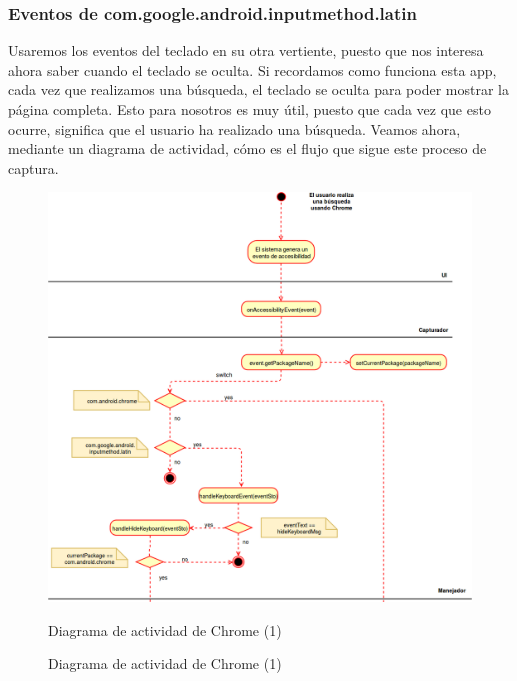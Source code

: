 \documentclass[12pt,a4paper,oneside]{book} %
\begin{document}
\subsubsection{Eventos de com.google.android.inputmethod.latin}
Usaremos los eventos del teclado en su otra vertiente, puesto que nos interesa ahora saber cuando el teclado se oculta. 
\newline \newline 
Si recordamos como funciona esta app, cada vez que realizamos una búsqueda, el teclado se oculta para poder mostrar la página completa. Esto para nosotros es muy útil, puesto que cada vez que esto ocurre, significa que el usuario ha realizado una búsqueda. 
\newline \newline
Veamos ahora, mediante un diagrama de actividad, cómo es el flujo que sigue este proceso de captura. 
\begin{landscape}
\begin{figure}[htb]
	\begin{center}
     	\includegraphics[scale=0.4]{pictures/activity/chromeActivityDiagram1.png}
	    	\caption{Diagrama de actividad de Chrome (1)}{Diagrama de actividad de Chrome (1)}
    	\label{fig:Diagrama de actividad Chrome (1)}
	\end{center}
\end{figure}
\end{landscape}
\end{document}
